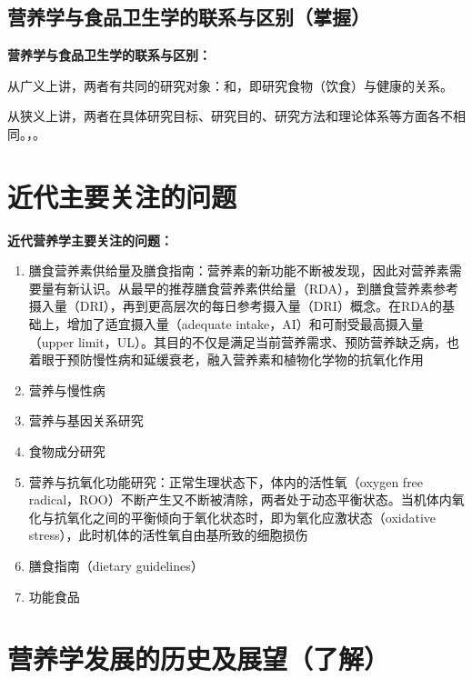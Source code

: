\subsection{营养学与食品卫生学的联系与区别（掌握）}

\begin{keybox}
\textbf{营养学与食品卫生学的联系与区别：}

从广义上讲，两者有共同的研究对象：和，即研究食物（饮食）与健康的关系。

从狭义上讲，两者在具体研究目标、研究目的、研究方法和理论体系等方面各不相同。，。
\end{keybox}

\section{近代主要关注的问题}

\begin{tipbox}
\textbf{近代营养学主要关注的问题：}
\begin{enumerate}[leftmargin=*]
    \item 膳食营养素供给量及膳食指南：营养素的新功能不断被发现，因此对营养素需要量有新认识。从最早的推荐膳食营养素供给量（RDA），到膳食营养素参考摄入量（DRI），再到更高层次的每日参考摄入量（DRI）概念。在RDA的基础上，增加了适宜摄入量（adequate intake，AI）和可耐受最高摄入量（upper limit，UL）。其目的不仅是满足当前营养需求、预防营养缺乏病，也着眼于预防慢性病和延缓衰老，融入营养素和植物化学物的抗氧化作用
    \item 营养与慢性病
    \item 营养与基因关系研究
    \item 食物成分研究
    \item 营养与抗氧化功能研究：正常生理状态下，体内的活性氧（oxygen free radical，ROO）不断产生又不断被清除，两者处于动态平衡状态。当机体内氧化与抗氧化之间的平衡倾向于氧化状态时，即为氧化应激状态（oxidative stress），此时机体的活性氧自由基所致的细胞损伤
    \item 膳食指南（dietary guidelines）
    \item 功能食品
\end{enumerate}
\end{tipbox}

\section{营养学发展的历史及展望（了解）}

